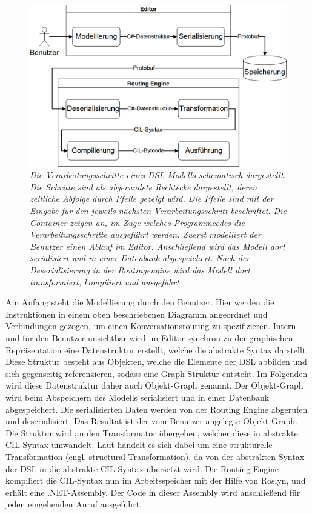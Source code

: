 \begin{figure} %
	\centering
		\includegraphics[width=\textwidth]{img/Verarbeitungsschritte.png}
	\caption[Verarbeitungsschritte eines DSL-Modells]{\textit{Die Verarbeitungsschritte eines DSL-Modells schematisch dargestellt. Die Schritte sind als abgerundete Rechtecke dargestellt, deren zeitliche Abfolge durch Pfeile gezeigt wird. Die Pfeile sind mit der Eingabe für den jeweils nächsten Verarbeitungsschritt beschriftet. Die Container zeigen an, im Zuge welches Programmcodes die Verarbeitungsschritte ausgeführt werden. Zuerst modelliert der Benutzer einen Ablauf im Editor. Anschließend wird das Modell dort serialisiert und in einer Datenbank abgespeichert. Nach der Deserialisierung in der Routingengine wird das Modell dort transformiert, kompiliert und ausgeführt.}}
	\label{fig:Verarbeitungsschritte}
\end{figure}
\noindent Am Anfang steht die Modellierung durch den Benutzer. Hier werden die Instruktionen in einem oben beschriebenen Diagramm angeordnet und Verbindungen gezogen, um einen Konversationsrouting zu spezifizieren. Intern und für den Benutzer unsichtbar wird im Editor synchron zu der graphischen Repräsentation eine Datenstruktur erstellt, welche die abstrakte Syntax darstellt. Diese Struktur besteht aus Objekten, welche die Elemente der DSL abbilden und sich gegenseitig referenzieren, sodass eine Graph-Struktur entsteht. Im Folgenden wird diese Datenstruktur daher auch Objekt-Graph genannt. Der Objekt-Graph wird beim Abspeichern des Modells serialisiert und in einer Datenbank abgespeichert. Die serialisierten Daten werden von der Routing Engine abgerufen und deserialisiert. Das Resultat ist der vom Benutzer angelegte Objekt-Graph. Die Struktur wird an den Transformator übergeben, welcher diese in abstrakte CIL-Syntax umwandelt. Laut \cite[S. 72f]{Kleppe:09} handelt es sich dabei um eine strukturelle Transformation (engl. structural Transformation), da von der abstrakten Syntax der DSL in die abstrakte CIL-Syntax übersetzt wird. Die Routing Engine kompiliert die CIL-Syntax nun im Arbeitsspeicher mit der Hilfe von Roslyn, und erhält eine .NET-Assembly. Der Code in dieser Assembly wird anschließend für jeden eingehenden Anruf ausgeführt. 

